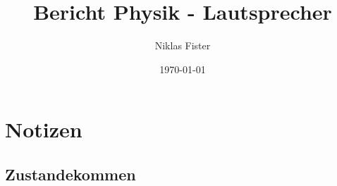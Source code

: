\documentclass{article}
\title{\Huge\textbf{Bericht Physik - Lautsprecher}}
\author{Niklas Fister}
\date{\today}
\begin{document}
\maketitle
\newpage
\section{Notizen}
\subsection{Zustandekommen}
\end{document}
